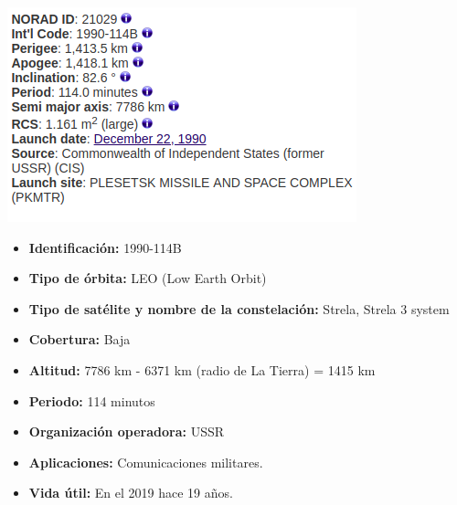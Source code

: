 \documentclass{article}
\begin{document}
\begin{center}
\includegraphics[scale=0.6]{COSMOS.png}
\end{center}

\begin{itemize}
\item \textbf{Identificación:} 1990-114B
\item \textbf{Tipo de órbita:} LEO (Low Earth Orbit)
\item \textbf{Tipo de satélite y nombre de la constelación:} Strela, Strela 3 system
\item \textbf{Cobertura:} Baja
\item \textbf{Altitud:} 7786 km - 6371 km (radio de La Tierra) = 1415 km
\item \textbf{Periodo:} 114 minutos
\item \textbf{Organización operadora:} USSR
\item \textbf{Aplicaciones:} Comunicaciones militares.
\item \textbf{Vida útil:} En el 2019 hace 19 años.
\end{itemize}
\end{document}
